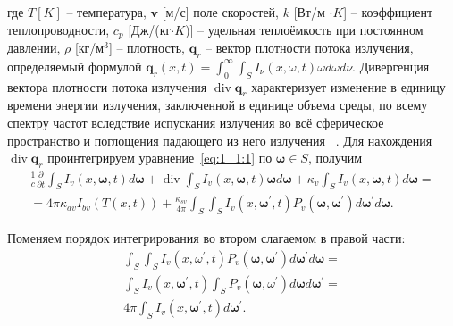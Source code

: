 где $T[K]$ -- температура, $\mathbf{v}$ [м/с] поле скоростей, $k$ [Вт/м $\cdot K$]
-- коэффициент теплопроводности, $c_p$ [Дж/(кг$\cdot K$)] --
удельная теплоёмкость при постоянном
давлении, $\rho$ [кг/$\text{м}^3$] -- плотность,
$\mathbf{q}_r$ -- вектор плотности потока излучения,
определяемый формулой\cite[292]{modest2013radiative}
$\mathbf{q}_r(x, t) = \int^\infty_0\int_S I_\nu(x,\omega,t)\omega d\omega d\nu$.
Дивергенция вектора плотности потока излучения $\operatorname{div} \mathbf{q}_r$
характеризует изменение в единицу времени энергии излучения,
заключенной в единице объема среды, по всему спектру частот вследствие испускания
излучения во всё сферическое пространство и поглощения падающего
из него излучения ~\cite[274]{Ozisik1976}.
Для нахождения $\operatorname{div} \mathbf{q}_{r}$ проинтегрируем
уравнение~\eqref{eq:1_1:1} по $\boldsymbol{\omega} \in S$, получим
\[
    \begin{gathered}
        \frac{1}{c} \frac{\partial}{\partial t}
        \int_{S} I_{v}(x, \boldsymbol{\omega}, t) d
        \boldsymbol{\omega}+\operatorname{div}
        \int_{S} I_{v}(x, \boldsymbol{\omega}, t) \boldsymbol{\omega} d
        \boldsymbol{\omega}+\kappa_{v}
        \int_{S} I_{v}(x, \boldsymbol{\omega}, t) d \boldsymbol{\omega}= \\
        = 4 \pi \kappa_{a v} I_{b v}(T(x, t))+\frac{\kappa_{s v}}{4 \pi} \int_{S}
        \int_{S} I_{v}\left(x, \boldsymbol{\omega}^{\prime},
        t\right) P_{v}\left(\boldsymbol{\omega},
        \boldsymbol{\omega}^{\prime}\right) d
        \boldsymbol{\omega}^{\prime} d \boldsymbol{\omega}.
    \end{gathered}
\]


Поменяем порядок интегрирования во втором слагаемом в правой части:
\[
    \begin{gathered}
        \int_{S} \int_{S} I_{v}\left(x, \omega^{\prime}, t\right) P_{v}
        \left(\boldsymbol{\omega},
        \boldsymbol{\omega}^{\prime}\right)
        d \boldsymbol{\omega}^{\prime} d \boldsymbol{\omega} = \\
        \int_{S} I_{v}\left(x, \boldsymbol{\omega}^{\prime}, t\right)
        \int_{S} P_{v}\left(\boldsymbol{\omega},
        \omega^{\prime}\right) d \boldsymbol{\omega}
        d \boldsymbol{\omega}^{\prime} = \\
        4 \pi \int_{S} I_{v}\left(x,
        \boldsymbol{\omega}^{\prime}, t\right) d \boldsymbol{\omega}^{\prime}.
    \end{gathered}
\]


